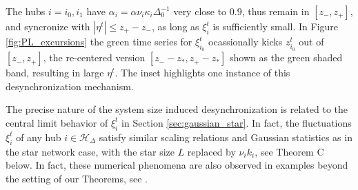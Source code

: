 \documentclass[a4paper]{article}
\theoremstyle{plain}
\theoremstyle{definition}
\newcommand{\Hil}{\mathcal{H}}
\begin{document}
The hubs $i=i_0,i_1$ have  $\alpha_i=\alpha \nu_i\kappa_i\Delta_0^{-1}$ very close to $0.9$, thus remain in $[z_-,z_+]$, and syncronize with $|\eta^t|\leq z_+-z_-$, as long as $\xi_i^t$ is sufficiently small. 
In Figure \ref{fig:PL_excursions} the green time series for $\xi_{i_0}^t$ ocassionally kicks $z_{i_0}^t$ out of $[z_-,z_+]$, the re-centered version $[z_--z_*, z_+ - z_*]$ shown as the green shaded band, resulting in large $\eta^t$. 
The inset highlights one instance of this desynchronization mechanism. %



The precise nature of the system size induced desynchronization is related to the central limit behavior of $\xi_{i}^t$ in Section \ref{sec:gaussian_star}. In fact, the fluctuations $\xi_i^t$ of any hub $i\in\Hil_{\Delta}$ satisfy similar scaling relations and Gaussian statistics as in the star network case, with the star size $L$ replaced by $\nu_ik_i$, see Theorem C below. In fact, these numerical phenomena are also observed in examples beyond the setting of our Theorems, see \cite{baptista2012collective,Ric16}. 
\end{document}
